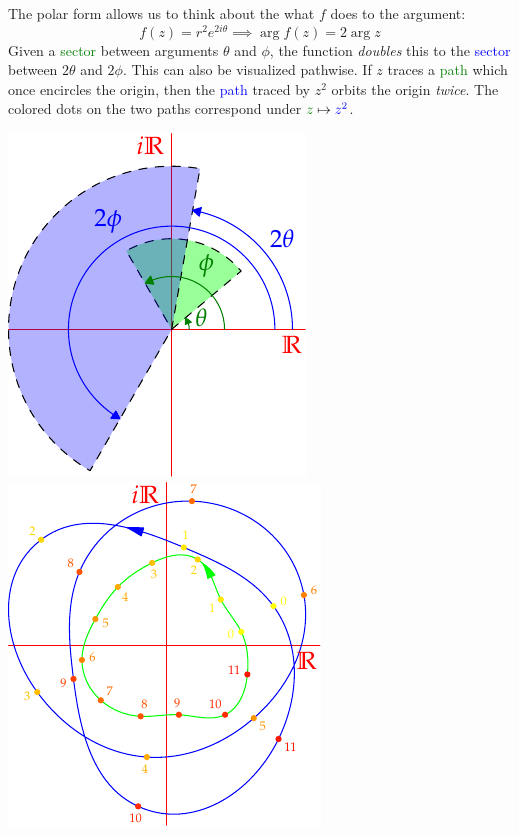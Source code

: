 \begin{example}{}{}
	The polar form allows us to think about the what $f$ does to the argument:
	\[
		f(z)=r^2e^{2i\theta}\implies \arg f(z)=2\arg z
	\]
	Given a \textcolor{Green}{sector} between arguments $\theta$ and $\phi$, the function \emph{doubles} this to the \textcolor{blue}{sector} between $2\theta$ and $2\phi$. This can also be visualized pathwise. If $z$ traces a \textcolor{Green}{path} which once encircles the origin, then the \textcolor{blue}{path} traced by $z^2$ orbits the origin \emph{twice}. The colored dots on the two paths correspond under $\textcolor{Green}{z}\mapsto \textcolor{blue}{z^2}$.
	\begin{center}
		\includegraphics{functions-zsq2}
		\qquad\qquad
		\includegraphics{functions-zsq3}
	\end{center}
\end{example}


